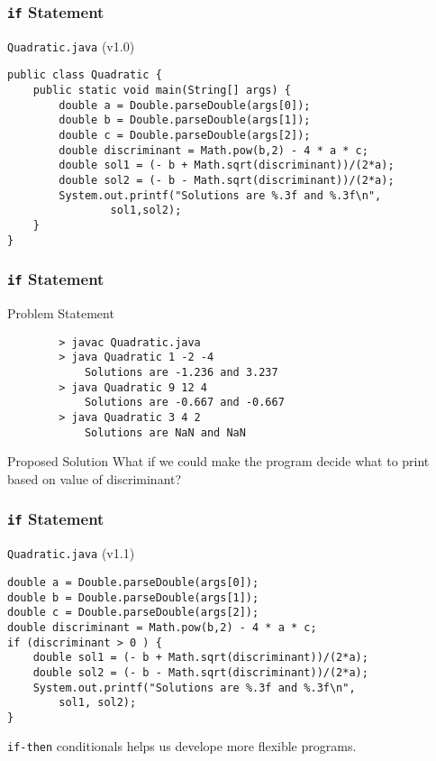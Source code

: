 \documentclass[10pt, compress]{beamer}
\begin{document}
\begin{frame}[fragile]
	\frametitle{\texttt{if} Statement}
	\begin{block}{\texttt{Quadratic.java} (v1.0)}
		\begin{verbatim}
public class Quadratic {
	public static void main(String[] args) {
		double a = Double.parseDouble(args[0]);
		double b = Double.parseDouble(args[1]);
		double c = Double.parseDouble(args[2]);
		double discriminant = Math.pow(b,2) - 4 * a * c;
		double sol1 = (- b + Math.sqrt(discriminant))/(2*a);
		double sol2 = (- b - Math.sqrt(discriminant))/(2*a);
		System.out.printf("Solutions are %.3f and %.3f\n",
				sol1,sol2);
	}
}
		\end{verbatim}
	\end{block}
\end{frame}

\begin{frame}[fragile]
	\frametitle{\texttt{if} Statement}
	\begin{block}{Problem Statement}
		\begin{verbatim}
		> javac Quadratic.java
		> java Quadratic 1 -2 -4
			Solutions are -1.236 and 3.237
		> java Quadratic 9 12 4
			Solutions are -0.667 and -0.667
		> java Quadratic 3 4 2
			Solutions are NaN and NaN
		\end{verbatim}
	\end{block}
	\begin{block}{Proposed Solution}
		What if we could make the program decide what to print based on value of discriminant?
	\end{block}
\end{frame}

\begin{frame}[fragile]
	\frametitle{\texttt{if} Statement}
	\begin{block}{\texttt{Quadratic.java} (v1.1)}
		\begin{verbatim}
double a = Double.parseDouble(args[0]);
double b = Double.parseDouble(args[1]);
double c = Double.parseDouble(args[2]);
double discriminant = Math.pow(b,2) - 4 * a * c;
if (discriminant > 0 ) {
	double sol1 = (- b + Math.sqrt(discriminant))/(2*a);
	double sol2 = (- b - Math.sqrt(discriminant))/(2*a);
	System.out.printf("Solutions are %.3f and %.3f\n",
		sol1, sol2);
}
		\end{verbatim}
	\end{block}
	\texttt{if-then} conditionals helps us develope more flexible programs.
\end{frame}
\end{document}
